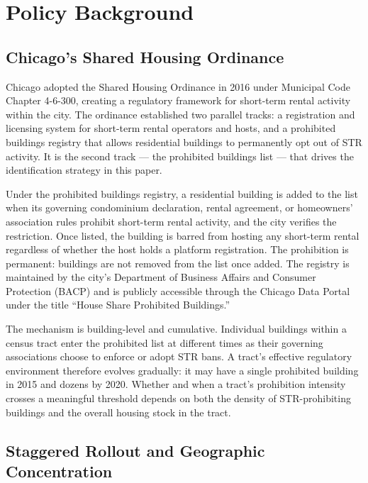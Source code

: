 \section{Policy Background}\label{sec:policy}

\subsection{Chicago's Shared Housing Ordinance}

Chicago adopted the Shared Housing Ordinance in 2016 under Municipal Code Chapter 4-6-300, creating a regulatory framework for short-term rental activity within the city. The ordinance established two parallel tracks: a registration and licensing system for short-term rental operators and hosts, and a prohibited buildings registry that allows residential buildings to permanently opt out of STR activity. It is the second track --- the prohibited buildings list --- that drives the identification strategy in this paper.

Under the prohibited buildings registry, a residential building is added to the list when its governing condominium declaration, rental agreement, or homeowners' association rules prohibit short-term rental activity, and the city verifies the restriction. Once listed, the building is barred from hosting any short-term rental regardless of whether the host holds a platform registration. The prohibition is permanent: buildings are not removed from the list once added. The registry is maintained by the city's Department of Business Affairs and Consumer Protection (BACP) and is publicly accessible through the Chicago Data Portal under the title ``House Share Prohibited Buildings.''

The mechanism is building-level and cumulative. Individual buildings within a census tract enter the prohibited list at different times as their governing associations choose to enforce or adopt STR bans. A tract's effective regulatory environment therefore evolves gradually: it may have a single prohibited building in 2015 and dozens by 2020. Whether and when a tract's prohibition intensity crosses a meaningful threshold depends on both the density of STR-prohibiting buildings and the overall housing stock in the tract.

\subsection{Staggered Rollout and Geographic Concentration}

